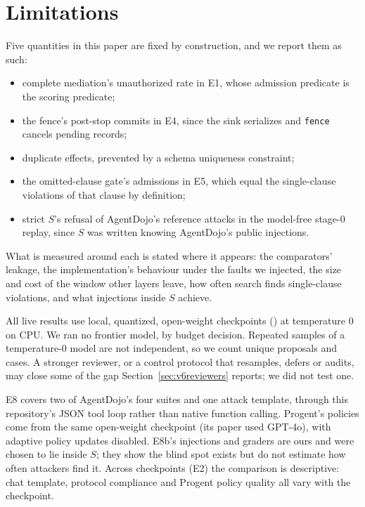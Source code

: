\section{Limitations}\label{sec:v6limits}

 Five quantities in this paper are fixed by construction, and we report them as such:
\begin{itemize}
  \item complete mediation's unauthorized rate in E1, whose admission predicate is the scoring predicate;
  \item the fence's post-stop commits in E4, since the sink serializes and \texttt{fence} cancels pending records;
  \item duplicate effects, prevented by a schema uniqueness constraint;
  \item the omitted-clause gate's admissions in E5, which equal the single-clause violations of that clause by
        definition;
  \item strict \(S\)'s refusal of AgentDojo's reference attacks in the model-free stage-0 replay, since \(S\) was
        written knowing AgentDojo's public injections.
\end{itemize}
What is measured around each is stated where it appears: the comparators' leakage, the implementation's behaviour
under the faults we injected, the size and cost of the window other layers leave, how often search finds single-clause
violations, and what injections inside \(S\) achieve.

 All live results use local, quantized, open-weight checkpoints (\vsixCheckpointList) at
temperature 0 on CPU. We ran no frontier model, by budget decision. Repeated samples of a temperature-0
model are not independent, so we count unique proposals and cases. A stronger reviewer, or a control protocol that
resamples, defers or audits, may close some of the gap Section~\ref{sec:v6reviewers} reports; we did not test one.

 E8 covers two of AgentDojo's four suites and one attack template, through this repository's
JSON tool loop rather than native function calling. Progent's policies come from the same open-weight checkpoint (its
paper used GPT-4o), with adaptive policy updates disabled. E8b's injections and graders are ours and were chosen to lie
inside \(S\); they show the blind spot exists but do not estimate how often attackers find it. Across checkpoints (E2)
the comparison is descriptive: chat template, protocol compliance and Progent policy quality all vary with the
checkpoint.

